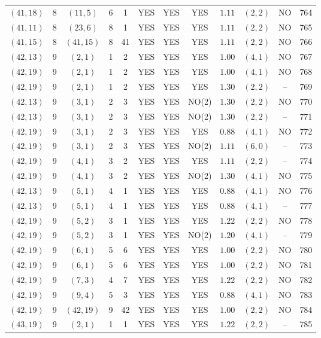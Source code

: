 \begin{longtable}{|c|c|c|c|c|c|c|c|c|c|c|c|}
$(41,18)$ & 8 & $(11,5)$ & 6 & 1 & YES & YES & YES & $1.11$ & $(2,2)$ & NO & 764\\
$(41,11)$ & 8 & $(23,6)$ & 8 & 1 & YES & YES & YES & $1.11$ & $(2,2)$ & NO & 765\\
$(41,15)$ & 8 & $(41,15)$ & 8 & 41 & YES & YES & YES & $1.11$ & $(2,2)$ & NO & 766\\
$(42,13)$ & 9 & $(2,1)$ & 1 & 2 & YES & YES & YES & $1.00$ & $(4,1)$ & NO & 767\\
$(42,19)$ & 9 & $(2,1)$ & 1 & 2 & YES & YES & YES & $1.00$ & $(4,1)$ & NO & 768\\
$(42,19)$ & 9 & $(2,1)$ & 1 & 2 & YES & YES & YES & $1.30$ & $(2,2)$ & -- & 769\\
$(42,13)$ & 9 & $(3,1)$ & 2 & 3 & YES & YES & NO(2) & $1.30$ & $(2,2)$ & NO & 770\\
$(42,13)$ & 9 & $(3,1)$ & 2 & 3 & YES & YES & NO(2) & $1.30$ & $(2,2)$ & -- & 771\\
$(42,19)$ & 9 & $(3,1)$ & 2 & 3 & YES & YES & YES & $0.88$ & $(4,1)$ & NO & 772\\
$(42,19)$ & 9 & $(3,1)$ & 2 & 3 & YES & YES & NO(2) & $1.11$ & $(6,0)$ & -- & 773\\
$(42,19)$ & 9 & $(4,1)$ & 3 & 2 & YES & YES & YES & $1.11$ & $(2,2)$ & -- & 774\\
$(42,19)$ & 9 & $(4,1)$ & 3 & 2 & YES & YES & NO(2) & $1.30$ & $(4,1)$ & NO & 775\\
$(42,13)$ & 9 & $(5,1)$ & 4 & 1 & YES & YES & YES & $0.88$ & $(4,1)$ & NO & 776\\
$(42,13)$ & 9 & $(5,1)$ & 4 & 1 & YES & YES & YES & $0.88$ & $(4,1)$ & -- & 777\\
$(42,19)$ & 9 & $(5,2)$ & 3 & 1 & YES & YES & YES & $1.22$ & $(2,2)$ & NO & 778\\
$(42,19)$ & 9 & $(5,2)$ & 3 & 1 & YES & YES & NO(2) & $1.20$ & $(4,1)$ & -- & 779\\
$(42,19)$ & 9 & $(6,1)$ & 5 & 6 & YES & YES & YES & $1.00$ & $(2,2)$ & NO & 780\\
$(42,19)$ & 9 & $(6,1)$ & 5 & 6 & YES & YES & YES & $1.00$ & $(2,2)$ & NO & 781\\
$(42,19)$ & 9 & $(7,3)$ & 4 & 7 & YES & YES & YES & $1.22$ & $(2,2)$ & NO & 782\\
$(42,19)$ & 9 & $(9,4)$ & 5 & 3 & YES & YES & YES & $0.88$ & $(4,1)$ & NO & 783\\
$(42,19)$ & 9 & $(42,19)$ & 9 & 42 & YES & YES & YES & $1.00$ & $(2,2)$ & NO & 784\\
$(43,19)$ & 9 & $(2,1)$ & 1 & 1 & YES & YES & YES & $1.22$ & $(2,2)$ & -- & 785\\

\end{longtable}
